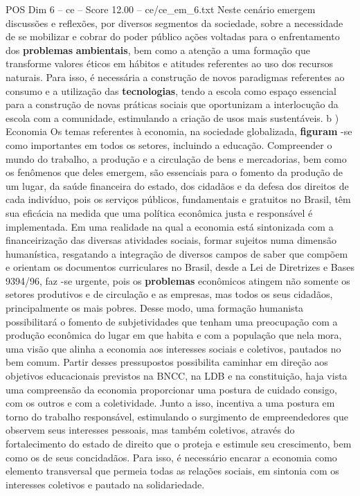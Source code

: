 \begin{textsample}{POS Dim 6 – ce – Score 12.00 – ce/ce\_em\_6.txt}
Neste cenário emergem discussões e reflexões, por diversos segmentos da sociedade, sobre a necessidade de se mobilizar e cobrar do poder público ações voltadas para o enfrentamento dos \textbf{problemas} \textbf{ambientais}, bem como a atenção a uma formação que transforme valores éticos em hábitos e atitudes referentes ao uso dos recursos naturais.
Para isso, é necessária a construção de novos paradigmas referentes ao consumo e a utilização das \textbf{tecnologias}, tendo a escola como espaço essencial para a construção de novas práticas sociais que oportunizam a interlocução da escola com a comunidade, estimulando a criação de usos mais sustentáveis. b ) Economia Os temas referentes à economia, na sociedade globalizada, \textbf{figuram} -se como importantes em todos os setores, incluindo a educação.
Compreender o mundo do trabalho, a produção e a circulação de bens e mercadorias, bem como os fenômenos que deles emergem, são essenciais para o fomento da produção de um lugar, da saúde financeira do estado, dos cidadãos e da defesa dos direitos de cada indivíduo, pois os serviços públicos, fundamentais e gratuitos no Brasil, têm sua eficácia na medida que uma política econômica justa e responsável é implementada.
Em uma realidade na qual a economia está sintonizada com a financeirização das diversas atividades sociais, formar sujeitos numa dimensão humanística, resgatando a integração de diversos campos de saber que compõem e orientam os documentos curriculares no Brasil, desde a Lei de Diretrizes e Bases 9394/96, faz -se urgente, pois os \textbf{problemas} econômicos atingem não somente os setores produtivos e de circulação e as empresas, mas todos os seus cidadãos, principalmente os mais pobres.
Desse modo, uma formação humanista possibilitará o fomento de subjetividades que tenham uma preocupação com a produção econômica do lugar em que habita e com a população que nela mora, uma visão que alinha a economia aos interesses sociais e coletivos, pautados no bem comum.
Partir desses pressupostos possibilita caminhar em direção aos objetivos educacionais previstos na BNCC, na LDB e na constituição, haja vista uma compreensão da economia proporcionar uma postura de cuidado consigo, com os outros e com a coletividade.
Junto a isso, incentiva a uma postura em torno do trabalho responsável, estimulando o surgimento de empreendedores que observem seus interesses pessoais, mas também coletivos, através do fortalecimento do estado de direito que o proteja e estimule seu crescimento, bem como os de seus concidadãos.
Para isso, é necessário encarar a economia como elemento transversal que permeia todas as relações sociais, em sintonia com os interesses coletivos e pautado na solidariedade.

\end{textsample}
